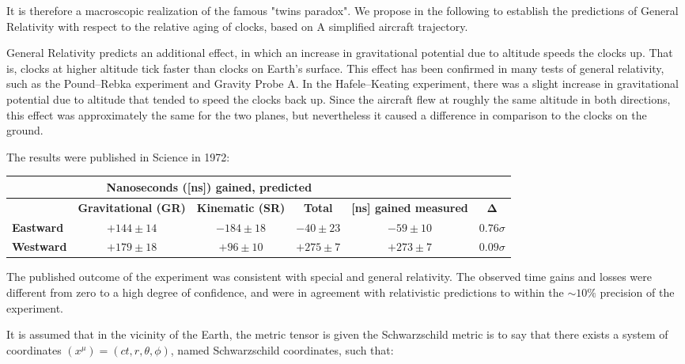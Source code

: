 	It is therefore a macroscopic realization of the famous "twins paradox". We propose in the following to establish the predictions of General Relativity with respect to the relative aging of clocks, based on A simplified aircraft trajectory.

	General Relativity predicts an additional effect, in which an increase in gravitational potential due to altitude speeds the clocks up. That is, clocks at higher altitude tick faster than clocks on Earth's surface. This effect has been confirmed in many tests of general relativity, such as the Pound–Rebka experiment and Gravity Probe A. In the Hafele–Keating experiment, there was a slight increase in gravitational potential due to altitude that tended to speed the clocks back up. Since the aircraft flew at roughly the same altitude in both directions, this effect was approximately the same for the two planes, but nevertheless it caused a difference in comparison to the clocks on the ground.
	
	The results were published in Science in 1972:
	\begin{table}[H]
		\centering
		\begin{tabular}{|l|c|c|c|l|l|}
		\hline
		\rowcolor[HTML]{9B9B9B} 
		 & \multicolumn{3}{c|}{\cellcolor[HTML]{9B9B9B}\textbf{Nanoseconds ([ns]) gained, predicted}} &  &  \\ \hline
		\rowcolor[HTML]{9B9B9B} 
		 & \textbf{Gravitational (GR)} & \multicolumn{1}{l|}{\cellcolor[HTML]{9B9B9B}\textbf{Kinematic (SR)}} & \textbf{Total} & \parbox{2cm}{\textbf{[ns] gained measured}} &  \\ \hline
		\textbf{Eastward} & $+144 \pm 14$ & $-184 \pm 18$ & $-40 \pm 23$ &  & $0.76 \sigma$ \\ \hline
		\textbf{Westward} & $+179\pm 18$ & $+96 \pm 10$ & $+275 \pm 7$ &  & $0.09 \sigma$ \\ \hline
		\end{tabular}
	\end{table}
	The published outcome of the experiment was consistent with special and general relativity. The observed time gains and losses were different from zero to a high degree of confidence, and were in agreement with relativistic predictions to within the $\sim 10\%$ precision of the experiment.	
	
	It is assumed that in the vicinity of the Earth, the metric tensor is given the Schwarzschild metric is to say that there exists a system of coordinates $(x^\mu)=(ct,r,\theta,\phi)$, named Schwarzschild coordinates, such that:
	
